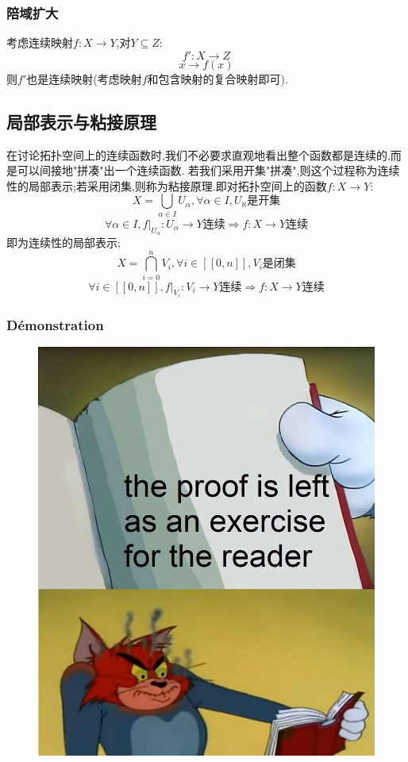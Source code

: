 \documentclass[12pt, a4paper, oneside]{ctexbook}
\begin{document}
  \subsubsection{陪域扩大}
  考虑连续映射$f:X\rightarrow Y$,对$Y\subseteq Z:$
  $$
    f': X\rightarrow Z
  $$
  $$
    x\rightarrow f(x)
  $$
  则$f'$也是连续映射(考虑映射$f$和包含映射的复合映射即可).
  \subsection{局部表示与粘接原理}
  在讨论拓扑空间上的连续函数时,我们不必要求直观地看出整个函数都是连续的,而是可以间接地"拼凑"出一个连续函数.
  若我们采用开集"拼凑",则这个过程称为连续性的局部表示;若采用闭集,则称为粘接原理.即对拓扑空间上的函数$f:X\rightarrow Y$:
  $$
    X=\bigcup_{\alpha\in I}U_\alpha ,\forall \alpha\in I, U_\aleph\text{是开集}
  $$
  $$
  \forall \alpha\in I,f|_{U_\alpha}:U_\alpha\rightarrow Y\text{连续}\Rightarrow f:X\rightarrow Y\text{连续}
  $$
  即为连续性的局部表示;
  $$
    X=\bigcap_{i=0}^{n}V_i ,\forall i\in[\![0,n]\!], V_i\text{是闭集}
  $$
  $$
    \forall i\in[\![0,n]\!],f|_{V_i}:V_i\rightarrow Y\text{连续}\Rightarrow f:X\rightarrow Y\text{连续}
  $$
  \subsubsection{Démonstration}
  \begin{figure}[H]%
    \centering
    \includegraphics[scale=0.2]{证明留给读者.jpg}
  \end{figure}
\end{document}
